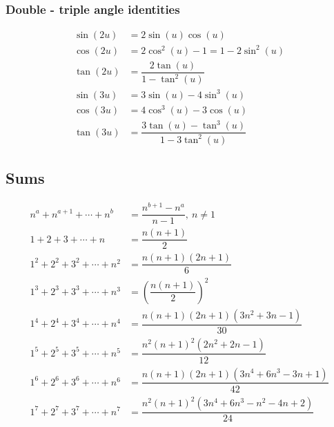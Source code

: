 \subsubsection{Double - triple angle identities}
\vspace{-0.6cm}
\begin{align*}
\sin(2u) &= 2\sin(u)\cos(u) \\ 
\cos(2u) &= 2\cos^2(u) - 1 = 1 - 2\sin^2(u) \\
\tan(2u) &= \dfrac{2\tan(u)}{1-\tan^2(u)} \\ 
\sin(3u) &= 3\sin(u) - 4\sin^3(u) \\ 
\cos(3u) &= 4\cos^3(u) - 3\cos(u) \\ 
\tan(3u) &= \dfrac{3\tan(u) - \tan^3(u)}{1 - 3\tan^2(u)}
\end{align*}

\subsection{Sums}
\vspace{-0.6cm}
\begin{align*}
	n^{a} + n^{a + 1} + \cdots + n^{b} &= \dfrac{n^{b + 1} - n^{a}}{n - 1},\ n \neq 1 \\
	1 + 2 + 3 + \cdots + n &= \dfrac{n(n + 1)}{2} \\
	1^2 + 2^2 + 3^2 + \cdots + n^2 &= \dfrac{n(n + 1)(2n + 1)}{6} \\ 
	1^3 + 2^3 + 3^3 + \cdots + n^3 &= \left(\dfrac{n(n + 1)}{2}\right)^2 \\ 
	1^4 + 2^4 + 3^4 + \cdots + n^4 &= \dfrac{n(n + 1)(2n + 1)(3n^2 + 3n - 1)}{30} \\
	1^5 + 2^5 + 3^5 + \cdots + n^5 &= \dfrac{n^2(n + 1)^2(2n^2 + 2n - 1)}{12} \\
	1^6 + 2^6 + 3^6 + \cdots + n^6 &= \dfrac{n(n + 1)(2n + 1)(3n^4 + 6n^3 - 3n + 1)}{42} \\
	1^7 + 2^7 + 3^7 + \cdots + n^7 &= \dfrac{n^2(n + 1)^2(3n^4 + 6n^3 - n^2 - 4n + 2)}{24}
\end{align*}